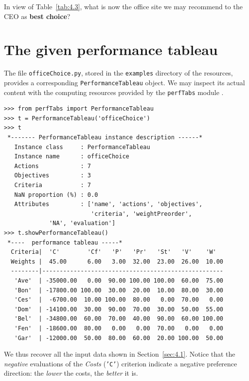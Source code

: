 In view of Table~\vref{tab:4.3}, what is now the office site we may recommend to the CEO as \textbf{best choice}?

\section{The given performance tableau}
\label{sec:4.2}


The file \texttt{officeChoice.py}, stored in the \texttt{examples} directory of the \Digraph resources, provides a corresponding \texttt{PerformanceTableau} object. We may inspect its actual content with the computing resources provided by the \texttt{perfTabs} module .
\begin{lstlisting}[caption={Inspecting the \texttt{officeChoice} performance tableau.},label=list:4.1]
>>> from perfTabs import PerformanceTableau
>>> t = PerformanceTableau('officeChoice')
>>> t
 *------- PerformanceTableau instance description ------*
   Instance class     : PerformanceTableau
   Instance name      : officeChoice
   Actions            : 7
   Objectives         : 3
   Criteria           : 7
   NaN proportion (%) : 0.0
   Attributes         : ['name', 'actions', 'objectives',
                         'criteria', 'weightPreorder',
			 'NA', 'evaluation']
>>> t.showPerformanceTableau()
 *----  performance tableau -----*
  Criteria|  'C'        'Cf'   'P'   'Pr'   'St'   'V'    'W'   
  Weights |  45.00      6.00   3.00  32.00  23.00  26.00  10.00    
  --------|----------------------------------------------------
   'Ave'  | -35000.00   0.00  90.00 100.00 100.00  60.00  75.00  
   'Bon'  | -17800.00 100.00  30.00  20.00  10.00  80.00  30.00  
   'Ces'  |  -6700.00  10.00 100.00  80.00   0.00  70.00   0.00  
   'Dom'  | -14100.00  30.00  90.00  70.00  30.00  50.00  55.00  
   'Bel'  | -34800.00  60.00  70.00  40.00  90.00  60.00 100.00  
   'Fen'  | -18600.00  80.00   0.00   0.00  70.00   0.00   0.00  
   'Gar'  | -12000.00  50.00  80.00  60.00  20.00 100.00  50.00  
\end{lstlisting}

We thus recover all the input data shown in Section~\ref{sec:4.1}. Notice that the \emph{negative} evaluations of the \emph{Costs} (\texttt{'C'}) criterion indicate a negative preference direction: the \emph{lower} the costs, the \emph{better} it is.

